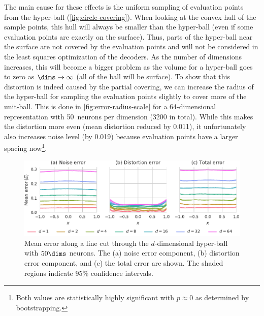 The main cause for these effects is the uniform sampling of evaluation points from the hyper-ball (\cref{fig:circle-covering}).
When looking at the convex hull of the sample points, this hull will always be smaller than the hyper-ball (even if some evaluation points are exactly on the surface).
Thus, parts of the hyper-ball near the surface are not covered by the evaluation points and will not be considered in the least squares optimization of the decoders.
As the number of dimensions increases, this will become a bigger problem as the volume for a hyper-ball goes to zero as $\dims \rightarrow \infty$ (all of the ball will be surface).
To show that this distortion is indeed caused by the partial covering, we can increase the radius of the hyper-ball for sampling the evaluation points slightly to cover more of the unit-ball.
This is done in \cref{fig:error-radius-scale} for a 64-dimensional representation with \num{50}~neurons per dimension (\num{3200} in total).
While this makes the distortion more even (mean distortion reduced by \num{0.011}), it unfortunately also increases noise level (by \num{0.019}) because evaluation points have a larger spacing now\footnote{Both values are statistically highly significant with $p \approx 0$ as determined by bootstrapping.}.
\begin{figure}
    \centering
    \includegraphics{figures/error-linecut}
    \caption{Mean error along a line cut through the $d$-dimensional hyper-ball with $50\dims$ neurons. The (a) noise error component, (b) distortion error component, and (c) the total error are shown. The shaded regions indicate 95\% confidence intervals.}\label{fig:error-linecut}
\end{figure}
